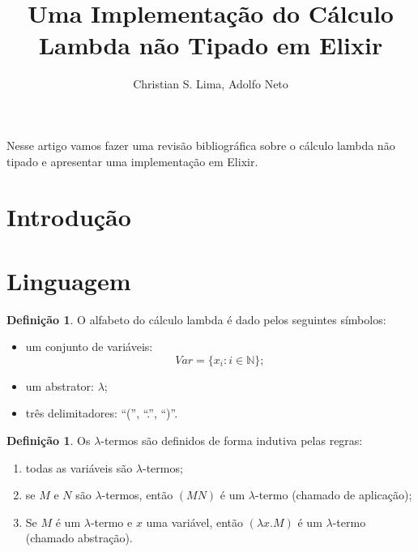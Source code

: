 \documentclass[12pt]{article}
\title{Uma Implementação do Cálculo Lambda não Tipado em Elixir}
\author{Christian S. Lima\inst{1}, Adolfo Neto\inst{1} }
\theoremstyle{definition}
\newtheorem{definition}[theorem]{Definição}
\begin{document}
 

\maketitle

\begin{abstract}
  
\end{abstract}
     
\begin{resumo} 
  Nesse artigo vamos fazer uma revisão bibliográfica sobre o cálculo lambda não tipado e apresentar uma implementação em Elixir.
\end{resumo}


\section{Introdução}


\section{Linguagem} \label{sec:firstpage}

\begin{definition}
  O alfabeto do cálculo lambda é dado pelos seguintes símbolos:
  \begin{itemize}
  \item um conjunto de variáveis:
    $$Var = \{x_i : i \in \mathbb{N}\};$$
  \item um abstrator: $\lambda$;
  \item três delimitadores: ``('', ``.'', ``)''.
  \end{itemize}
\end{definition}
\vspace{1cm}

\begin{definition}
  Os $\lambda$-termos são definidos de forma indutiva pelas regras:
  \begin{enumerate}
  \item todas as variáveis são $\lambda$-termos;
  \item se $M$ e $N$ são $\lambda$-termos, então $(MN)$ é um $\lambda$-termo (chamado de aplicação);
  \item Se $M$ é um $\lambda$-termo e $x$ uma variável, então $(\lambda x.M)$ é um $\lambda$-termo (chamado abstração). 
  \end{enumerate}
\end{definition}
\vspace{1cm}
\end{document}
